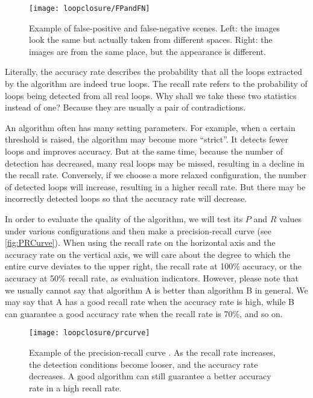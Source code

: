 \begin{figure}[!htp]
	\centering
	\texttt{[image: loopclosure/FPandFN]}
	\caption{Example of false-positive and false-negative scenes. Left: the images look the same but actually taken from different spaces. Right: the images are from the same place, but the appearance is different.}
	\label{fig:FPandFN}
\end{figure}

Literally, the accuracy rate describes the probability that all the loops extracted by the algorithm are indeed true loops. The recall rate refers to the probability of loops being detected from all real loops. Why shall we take these two statistics instead of one? Because they are usually a pair of contradictions.

An algorithm often has many setting parameters. For example, when a certain threshold is raised, the algorithm may become more ``strict''. It detects fewer loops and improves accuracy. But at the same time, because the number of detection has decreased, many real loops may be missed, resulting in a decline in the recall rate. Conversely, if we choose a more relaxed configuration, the number of detected loops will increase, resulting in a higher recall rate. But there may be incorrectly detected loops so that the accuracy rate will decrease.

In order to evaluate the quality of the algorithm, we will test its $P$ and $R$ values under various configurations and then make a precision-recall curve (see \autoref{fig:PRCurve}). When using the recall rate on the horizontal axis and the accuracy rate on the vertical axis, we will care about the degree to which the entire curve deviates to the upper right, the recall rate at 100\% accuracy, or the accuracy at 50\% recall rate, as evaluation indicators. However, please note that we usually cannot say that algorithm A is better than algorithm B in general. We may say that A has a good recall rate when the accuracy rate is high, while B can guarantee a good accuracy rate when the recall rate is 70\%, and so on.

\begin{figure}[!ht]
	\centering
	\texttt{[image: loopclosure/prcurve]}
	\caption{Example of the precision-recall curve {\cite{Gao2015b}}. As the recall rate increases, the detection conditions become looser, and the accuracy rate decreases. A good algorithm can still guarantee a better accuracy rate in a high recall rate.}
	\label{fig:PRCurve}
\end{figure}

